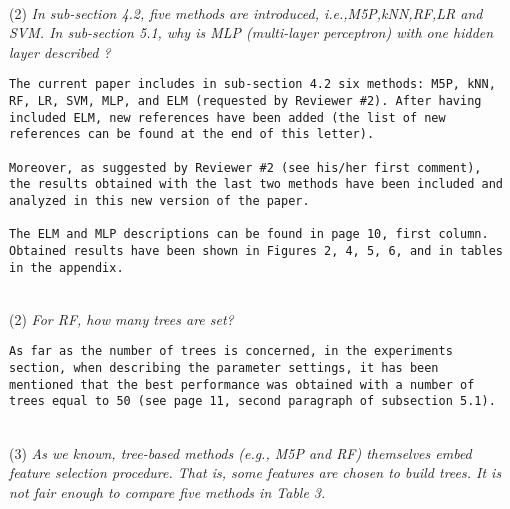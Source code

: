 \documentclass[preprint]{elsarticle}
\begin{document}
~\\
\noindent (2) \emph{In sub-section 4.2, five methods are introduced, i.e.,M5P,kNN,RF,LR and SVM. In sub-section 5.1, why is MLP (multi-layer perceptron) with one hidden layer described ?} 

\begin{verbatim}
The current paper includes in sub-section 4.2 six methods: M5P, kNN, 
RF, LR, SVM, MLP, and ELM (requested by Reviewer #2). After having 
included ELM, new references have been added (the list of new 
references can be found at the end of this letter).

Moreover, as suggested by Reviewer #2 (see his/her first comment), 
the results obtained with the last two methods have been included and 
analyzed in this new version of the paper.

The ELM and MLP descriptions can be found in page 10, first column.
Obtained results have been shown in Figures 2, 4, 5, 6, and in tables
in the appendix.
\end{verbatim}


~\\
\noindent (2) \emph{For RF, how many trees are set? }

\begin{verbatim}
As far as the number of trees is concerned, in the experiments 
section, when describing the parameter settings, it has been 
mentioned that the best performance was obtained with a number of 
trees equal to 50 (see page 11, second paragraph of subsection 5.1).
\end{verbatim}


~\\
\noindent (3) \emph{As we known, tree-based methods (e.g., M5P and RF) themselves embed feature selection procedure. That is, some features are chosen to build trees. It is not fair enough to compare five methods in Table 3. } 
\end{document}
